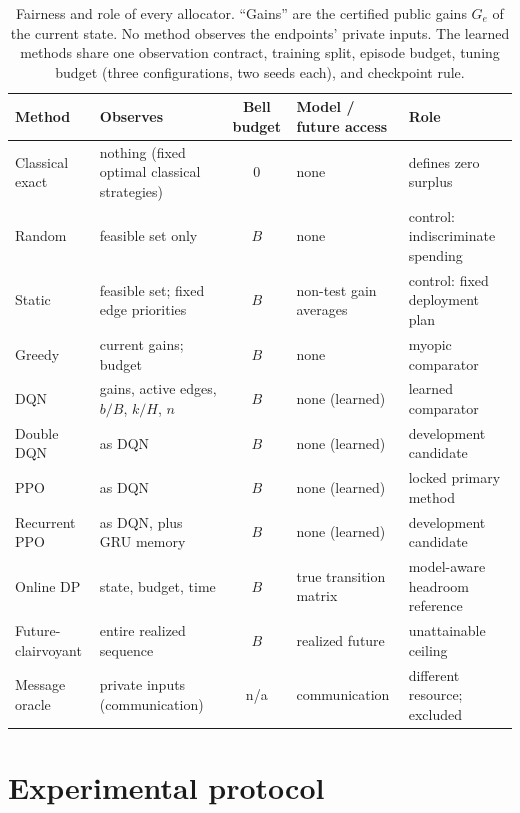 \documentclass[11pt,a4paper]{article}
\begin{document}
\begin{table}[t]
\centering
\caption{Fairness and role of every allocator. ``Gains'' are the certified public gains $G_e$ of the current state. No method observes the endpoints' private inputs. The learned methods share one observation contract, training split, episode budget, tuning budget (three configurations, two seeds each), and checkpoint rule.}
\label{tab:fairness}
\footnotesize
\setlength{\tabcolsep}{4pt}
\begin{tabularx}{\textwidth}{@{}l>{\raggedright\arraybackslash}Xc>{\raggedright\arraybackslash}p{27mm}>{\raggedright\arraybackslash}p{40mm}@{}}
\toprule
Method & Observes & Bell budget & Model / future access & Role \\
\midrule
Classical exact & nothing (fixed optimal classical strategies) & 0 & none & defines zero surplus \\
Random & feasible set only & $B$ & none & control: indiscriminate spending \\
Static & feasible set; fixed edge priorities & $B$ & non-test gain averages & control: fixed deployment plan \\
Greedy & current gains; budget & $B$ & none & myopic comparator \\
DQN & gains, active edges, $b/B$, $k/H$, $n$ & $B$ & none (learned) & learned comparator \\
Double DQN & as DQN & $B$ & none (learned) & development candidate \\
PPO & as DQN & $B$ & none (learned) & locked primary method \\
Recurrent PPO & as DQN, plus GRU memory & $B$ & none (learned) & development candidate \\
Online DP & state, budget, time & $B$ & true transition matrix & model-aware headroom reference \\
Future-clairvoyant & entire realized sequence & $B$ & realized future & unattainable ceiling \\
Message oracle & private inputs (communication) & n/a & communication & different resource; excluded \\
\bottomrule
\end{tabularx}
\end{table}

\section{Experimental protocol}\label{sec:protocol}
\end{document}
